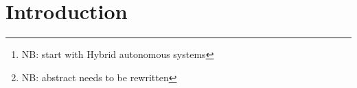 \documentclass[letterpaper, 10 pt, conference]{ieeeconf}  %
\newcommand\NB[1]{$\spadesuit$\footnote{NB: #1}}
\begin{document}
\begin{abstract}
\NB{start with Hybrid autonomous systems}
In this work, we develop a monitor that can predict the future states of multiple vehicles within a sensing range, and correct the actions of a user-operated hybrid autonomous vehicle (HAV) to ensure safety. We use a framework that leverages Hidden Markov Model (HMM) theory along with a simplified reachability analysis to perform a risk computation and trust analysis for imminent situations. Our monitor leaves the user in power when safe and intervenes only when the risk is above a threshold, in which case the user action is overwritten by actions that minimize risk. Using this method, we are able to guarantee that the vehicle is safe for the period in which risk is above the threshold. In addition, this approach was validated through simulations of an automotive scenario. \NB{abstract needs to be rewritten}


\end{abstract}

%
\IEEEpeerreviewmaketitle

\section{Introduction}

\end{document}
